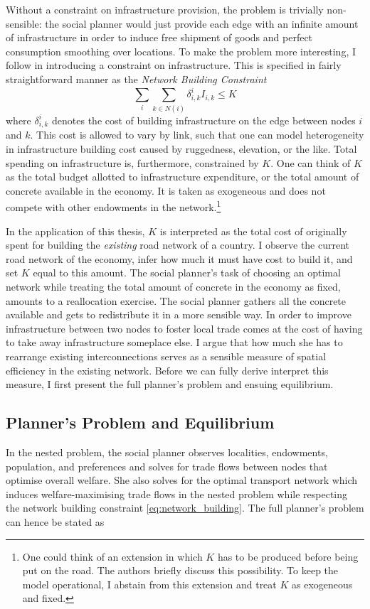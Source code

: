 \documentclass[11pt, oneside]{article}   	%
\begin{document}
Without a constraint on infrastructure provision, the problem is trivially non-sensible: the social planner would just provide each edge with an infinite amount of infrastructure in order to induce free shipment of goods and perfect consumption smoothing over locations. To make the problem more interesting, I follow \citeauthor{fajgelbaum_optimal_2017} in introducing a constraint on infrastructure. This is specified in fairly straightforward manner as the \emph{Network Building Constraint}
\begin{equation}
  \sum_{i}^{}\sum_{k\in N(i)}^{}\delta^{i}_{i,k}I_{i,k} \leq K
  \label{eq:network_building}
\end{equation}
where $\delta^{i}_{i,k}$ denotes the cost of building infrastructure on the edge between nodes $i$ and $k$. This cost is allowed to vary by link, such that one can model heterogeneity in infrastructure building cost caused by ruggedness, elevation, or the like. Total spending on infrastructure is, furthermore, constrained by $K$. One can think of $K$ as the total budget allotted to infrastructure expenditure, or the total amount of concrete available in the economy. It is taken as exogeneous and does not compete with other endowments in the network.\footnote{One could think of an extension in which $K$ has to be produced before being put on the road. The authors briefly discuss this possibility. To keep the model operational, I abstain from this extension and treat $K$ as exogeneous and fixed.}

In the application of this thesis, $K$ is interpreted as the total cost of originally spent for building the \emph{existing} road network of a country. I observe the current road network of the economy, infer how much it must have cost to build it, and set $K$ equal to this amount. The social planner's task of choosing an optimal network while treating the total amount of concrete in the economy as fixed, amounts to a reallocation exercise. The social planner gathers all the concrete available and gets to redistribute it in a more sensible way. In order to improve infrastructure between two nodes to foster local trade comes at the cost of having to take away infrastructure someplace else. I argue that how much she has to rearrange existing interconnections serves as a sensible measure of spatial efficiency in the existing network. Before we can fully derive interpret this measure, I first present the full planner's problem and ensuing equilibrium.

\subsection{Planner's Problem and Equilibrium}
In the nested problem, the social planner observes localities, endowments, population, and preferences and solves for trade flows between nodes that optimise overall welfare. She also solves for the optimal transport network which induces welfare-maximising trade flows in the nested problem while respecting the network building constraint \eqref{eq:network_building}. The full planner's problem can hence be stated as
\end{document}
